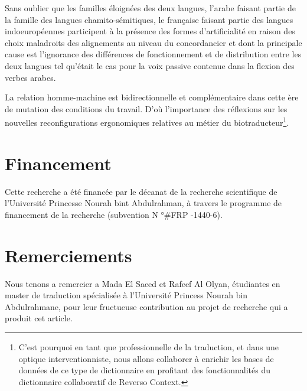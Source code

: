 \documentclass{textolivre}
\begin{document}
Sans oublier que les familles éloignées des deux langues, l’arabe faisant partie de la famille des langues chamito-sémitiques, le française faisant partie des langues indoeuropéennes participent à la présence des formes d’artificialité en raison des choix maladroits des alignements au niveau du concordancier et dont la principale cause est l’ignorance des différences de fonctionnement et de distribution entre les deux langues tel qu’était le cas pour la voix passive contenue dans la flexion des verbes arabes.

La relation homme-machine est bidirectionnelle et complémentaire dans cette ère de mutation des conditions du travail. D’où l’importance des réflexions sur les nouvelles reconfigurations ergonomiques relatives au métier du biotraducteur\footnote{C’est pourquoi en tant que professionnelle de la traduction, et dans une optique interventionniste, nous allons collaborer à enrichir les bases de données de ce type de dictionnaire en profitant des fonctionnalités du dictionnaire collaboratif de Reverso Context.}.

\section*{Financement}
Cette recherche a été financée par le décanat de la recherche scientifique de l’Université Princesse Nourah bint Abdulrahman, à travers le programme de financement de la recherche (subvention N °\#FRP -1440-6).

\section*{Remerciements}
Nous tenons a remercier a Mada El Saeed et Rafeef Al Olyan, étudiantes en master de traduction spécialisée à l’Université Princess Nourah bin Abdulrahmane, pour leur fructueuse contribution au projet de recherche qui a produit cet article.

\begin{portuguese}
\printbibliography[title={Références}]
\end{portuguese}
\end{document}

